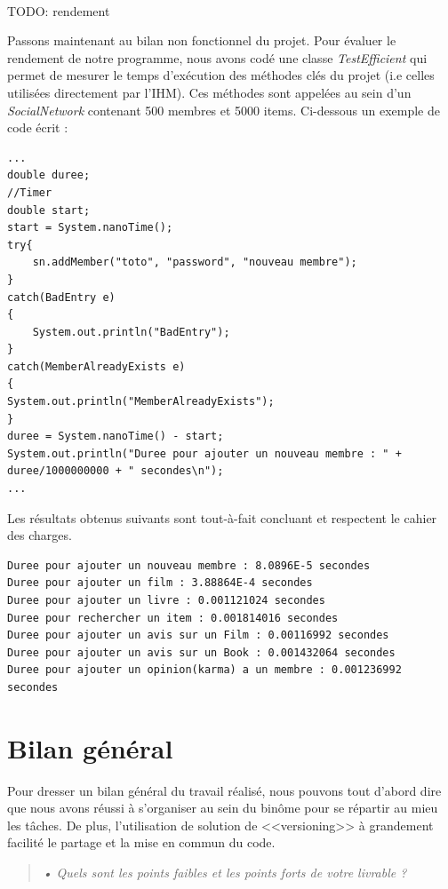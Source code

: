 \documentclass[12pt,a4paper]{report}
\begin{document}
\\TODO: rendement

Passons maintenant au bilan non fonctionnel du projet. Pour évaluer le rendement de notre programme,
nous avons codé une classe \emph{TestEfficient} qui permet de mesurer le temps d'exécution des méthodes clés du projet (i.e celles utilisées directement par l'IHM). Ces méthodes sont appelées au sein d'un \emph{SocialNetwork} contenant 500 membres et 5000 items. Ci-dessous un exemple de code écrit :

\begin{lstlisting}[caption = Code de rendement d'une fonction]
...
double duree;
//Timer
double start;
start = System.nanoTime();
try{
	sn.addMember("toto", "password", "nouveau membre");
}
catch(BadEntry e)
{
	System.out.println("BadEntry");
}
catch(MemberAlreadyExists e)
{
System.out.println("MemberAlreadyExists");
}
duree = System.nanoTime() - start;
System.out.println("Duree pour ajouter un nouveau membre : " + duree/1000000000 + " secondes\n");
...
\end{lstlisting} 
Les résultats obtenus suivants sont tout-à-fait concluant et respectent le cahier des charges.
\begin{lstlisting}[caption = Resultats obtenus]
Duree pour ajouter un nouveau membre : 8.0896E-5 secondes
Duree pour ajouter un film : 3.88864E-4 secondes
Duree pour ajouter un livre : 0.001121024 secondes
Duree pour rechercher un item : 0.001814016 secondes
Duree pour ajouter un avis sur un Film : 0.00116992 secondes
Duree pour ajouter un avis sur un Book : 0.001432064 secondes
Duree pour ajouter un opinion(karma) a un membre : 0.001236992 secondes
\end{lstlisting}


\chapter*{Bilan général}
\label{chapter:Bilan général} %
Pour dresser un bilan général du travail réalisé, nous pouvons tout d'abord dire que nous avons réussi à s'organiser au sein du binôme pour se répartir au mieu les tâches. De plus, l'utilisation de solution de <<versioning>> à grandement facilité le partage et la mise en commun du code.
\begin{quotation}
\textit{• Quels sont les points faibles et les points forts de votre livrable ?}
\end{quotation}
\end{document}
